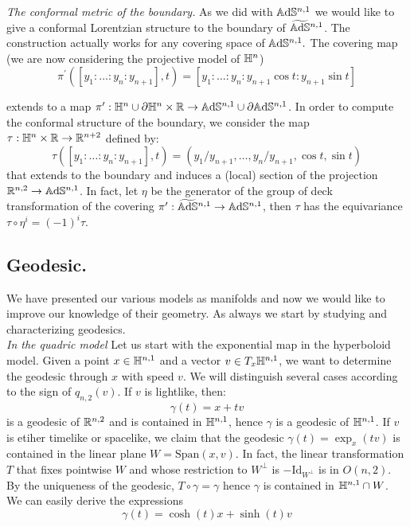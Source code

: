 \textit{The conformal metric of the boundary.} As we did with $\mathbb{A}\mathrm{d}\mathbb{S}^{n,1}$ we would like to give a conformal Lorentzian structure to the boundary of $\widetilde{\mathbb{A}\mathrm{d}\mathbb{S}}{}^{n,1}$. The construction actually works for any covering space of $\mathbb{A}\mathrm{d}\mathbb{S}^{n,1}.$ The covering map (we are now considering the projective model of $\mathbb{H}^n$)
\[
    \pi^{\prime} ([y_1:\dots:y_{n}:y_{n+1}],t)=[y_1:\dots:y_n:y_{n+1}\cos t:y_{n+1}\sin t]
\]

extends to a map $\pi^{\prime}:\mathbb{H}^n\cup \partial\mathbb{H}^n\times \mathbb{R}\to \mathbb{A}\mathrm{d}\mathbb{S}^{n,1}\cup \partial\mathbb{A}\mathrm{d}\mathbb{S}^{n,1}$. In order to compute the conformal structure of the boundary, we consider the map $\tau: \mathbb{H}^n\times \mathbb{R}\to\mathbb{R}^{n+2}$ defined by:
\[
    \tau([y_1:\dots:y_n:y_{n+1}],t)=(y_1/y_{n+1},\dots,y_n/y_{n+1},\cos t,\sin t)
\]  
 that extends to the boundary and induces a (local) section of the projection $\mathbb{R}^{n,2}\to \mathbb{A}\mathrm{d}\mathbb{S}^{n,1}$. In fact, let $\eta$ be the generator of the group of deck transformation of the covering $\pi^{\prime}:\widetilde{\mathbb{A}\mathrm{d}\mathbb{S}}{}^{n,1}   \to \mathbb{A}\mathrm{d}\mathbb{S}^{n,1}$, then $\tau$ has the equivariance $\tau\circ\eta^i=(-1)^i\tau.$  %
\subsection{Geodesic.}

We have presented our various models as manifolds and now we would like to improve our knowledge of their geometry. As always we start by studying and characterizing geodesics.\\ 

\textit{In the quadric model} Let us start with the exponential map in the hyperboloid model. Given a point $x\in \mathbb{H}^{n,1}$ and a vector $v\in T_x\mathbb{H}^{n,1}$, we want to determine the geodesic through $x$ with speed $v$. We will distinguish several cases according to the sign of $ q_{n,2}(v)$. If $v$ is lightlike, then: 
\[
    \gamma(t)=x+tv
\] is a geodesic of $\mathbb{R}^{n,2}$ and is contained in $\mathbb{H}^{n,1}$, hence $\gamma$ is a geodesic of $\mathbb{H}^{n,1}$. If $v$ is etiher timelike or spacelike, we claim that the geodesic $\gamma(t)=\exp_x(tv)$ is contained in the linear plane $W=\text{Span}(x,v).$ In fact, the linear transformation $T$ that fixes pointwise $W$ and whose restriction to $W^\perp$ is $-\text{Id}_{W^\perp}$ is in $O(n,2)$. By the uniqueness of the geodesic, $T\circ\gamma=\gamma$ hence $\gamma$ is contained in $\mathbb{H}^{n,1}\cap W$. We can easily derive the expressions\\
\begin{equation}
    \gamma(t)=\cosh(t)x+\sinh(t)v
\end{equation}

